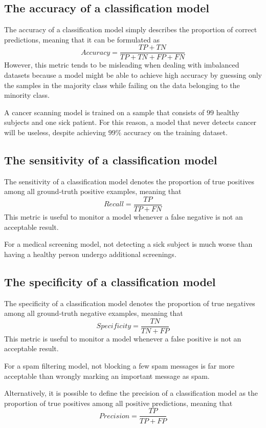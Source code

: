 \documentclass{report}
\begin{document}
\subsection{The accuracy of a classification model}
The accuracy of a classification model simply describes the proportion of correct predictions, meaning that it can be formulated as
\[Accuracy = \frac{TP + TN}{TP + TN + FP + FN}\]
However, this metric tends to be misleading when dealing with imbalanced datasets because a model might be able to achieve high accuracy by guessing only the samples in the majority class while failing on the data belonging to the minority class.
\begin{examplebox}
    A cancer scanning model is trained on a sample that consists of $\displaystyle 99$ healthy subjects and one sick patient. \newline
    For this reason, a model that never detects cancer will be useless, despite achieving $\displaystyle 99\%$ accuracy on the training dataset.
\end{examplebox}
\subsection{The sensitivity of a classification model}
The sensitivity of a classification model denotes the proportion of true positives among all ground-truth positive examples, meaning that
\[Recall = \frac{TP}{TP + FN}\]
This metric is useful to monitor a model whenever a false negative is not an acceptable result.
\begin{examplebox}
    For a medical screening model, not detecting a sick subject is much worse than having a healthy person undergo additional screenings.
\end{examplebox}
\subsection{The specificity of a classification model}
The specificity of a classification model denotes the proportion of true negatives among all ground-truth negative examples, meaning that
\[Specificity = \frac{TN}{TN + FP}\]
This metric is useful to monitor a model whenever a false positive is not an acceptable result.
\begin{examplebox}
    For a spam filtering model, not blocking a few spam messages is far more acceptable than wrongly marking an important message as spam.
\end{examplebox}
\noindent Alternatively, it is possible to define the precision of a classification model as the proportion of true positives among all positive predictions, meaning that
\[Precision = \frac{TP}{TP + FP}\]
\end{document}
